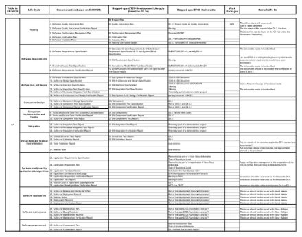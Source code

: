 \begin{figure}
\label{documentmapping} 
\centering
\includegraphics[width=21.001cm,height=16.341cm,angle=-90]{../images/documentmapping.pdf}
\end{figure}


